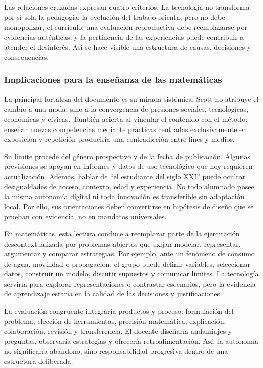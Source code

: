 \documentclass[spanish,letterpaper,oneside]{article}
\begin{document}
Las relaciones cruzadas expresan cuatro criterios. La tecnología no transforma por sí sola la pedagogía; la evolución del trabajo orienta, pero no debe monopolizar, el currículo; una evaluación reproductiva debe reemplazarse por evidencias auténticas; y la pertinencia de las experiencias puede contribuir a atender el desinterés. Así se hace visible una estructura de causas, decisiones y consecuencias.

\subsubsection{Implicaciones para la enseñanza de las matemáticas}

La principal fortaleza del documento es su mirada sistémica. Scott no atribuye el cambio a una moda, sino a la convergencia de presiones sociales, tecnológicas, económicas y cívicas. También acierta al vincular el contenido con el método: enseñar nuevas competencias mediante prácticas centradas exclusivamente en exposición y repetición produciría una contradicción entre fines y medios.

Su límite procede del género prospectivo y de la fecha de publicación. Algunas previsiones se apoyan en informes y datos de uso tecnológico que hoy requieren actualización. Además, hablar de ``el estudiante del siglo XXI'' puede ocultar desigualdades de acceso, contexto, edad y experiencia. No todo alumnado posee la misma autonomía digital ni toda innovación es transferible sin adaptación local. Por ello, sus orientaciones deben convertirse en hipótesis de diseño que se prueban con evidencia, no en mandatos universales.

En matemáticas, esta lectura conduce a reemplazar parte de la ejercitación descontextualizada por problemas abiertos que exijan modelar, representar, argumentar y comparar estrategias. Por ejemplo, ante un fenómeno de consumo de agua, movilidad o propagación, el grupo puede definir variables, seleccionar datos, construir un modelo, discutir supuestos y comunicar límites. La tecnología serviría para explorar representaciones o contrastar escenarios, pero la evidencia de aprendizaje estaría en la calidad de las decisiones y justificaciones.

La evaluación congruente integraría productos y proceso: formulación del problema, elección de herramientas, precisión matemática, explicación, colaboración, revisión y transferencia. El docente diseñaría andamiajes y preguntas, observaría estrategias y ofrecería retroalimentación. Así, la autonomía no significaría abandono, sino responsabilidad progresiva dentro de una estructura deliberada.
\end{document}
